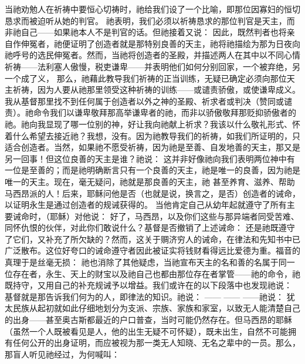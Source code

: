 当祂劝勉人在祈祷中要恒心切祷时，祂给我们设了一个比喻，即那位因寡妇的恒切恳求而被迫听从她的判官。 祂表明，我们必须以祈祷恳求的那位判官是天主，而非祂自己——如果祂本人不是判官的话。但祂接着又说： 因此，既然判者也将亲自作伸冤者，祂便证明了创造者就是那特别良善的天主，祂将祂描绘为那为日夜向祂呼号的选民伸冤者。然而，当祂将创造者的圣殿，并描述两人在其中以不同心情祈祷——法利塞人傲慢，税吏谦卑——并表明他们如何分别回家，一个被弃绝，另一个成了义， 那么，祂藉此教导我们祈祷的正当训练，无疑已确定必须向那位天主祈祷，因为人要从祂那里领受这种祈祷的训练——或谴责骄傲，或使谦卑成义。我从基督那里找不到任何属于创造者以外之神的圣殿、祈求者或判决（赞同或谴责）。祂命令我们以谦卑敬拜那高举谦卑者的祂，而非以骄傲敬拜那贬抑骄傲者的祂。祂向我显现了哪一位别的神，好让我向祂献上祈求？我该以什么敬礼形式、怀着什么希望去接近祂？我想，没有。因为祂教导我们的祈祷，如我们所证明的，只适合创造者。当然，如果祂不愿受祈祷，因为祂是至善、自发地善的天主，那又是另一回事！但这位良善的天主是谁？祂说： 这并非好像祂向我们表明两位神中有一位是至善的；而是祂明确断言只有一个良善的天主，祂是唯一的良善，因为祂是唯一的天主。现在，毫无疑问，祂就是那良善的天主，祂 甚至养育、滋养、帮助马西昂派的人！后来，耶稣问他是否（也就是说，换言之，是否）创造者的诫命，以证明永生是通过创造者的规诫获得的。 当他肯定自己从幼年起就遵守了所有主要诫命时，（耶稣）对他说： 好了，马西昂，以及你们这些与那异端者同受苦难、同怀仇恨的伙伴，对此你们敢说什么？基督是否撤销了上述诫命： 还是祂既遵守了它们，又补充了所欠缺的？然而，这关于赒济穷人的诫命，在律法和先知书中已广泛散布。这位好夸口的诫命遵守者因此被证实将钱财看得远比爱德为重。福音的真理于是丝毫无损： 祂也消除了其他疑虑，当祂宣布天主的名和善的名属于同一位存在者，永生、天上的财宝以及祂自己也都由那位存在者掌管——祂的命令，祂既持守，又用自己的补充规诫予以增益。我们或许在的以下段落中也发现祂说： 基督就是那告诉我们何为的人，即律法的知识。祂说： —— —— ——祂说： 犹太民族从起初就如此仔细地划分为支派、宗族、家族和家室，以致无人能清楚自己的出身——甚至奥古斯都最近的户口普查，当时可能仍然存在。但马西昂的耶稣（虽然一个人既被看见是人，他的出生无疑不可怀疑），既未出生，自然不可能拥有任何公开的出身证明，而应被视为那一类无人知晓、无名之辈中的一员。那么，那盲人听见祂经过，为何喊叫： 